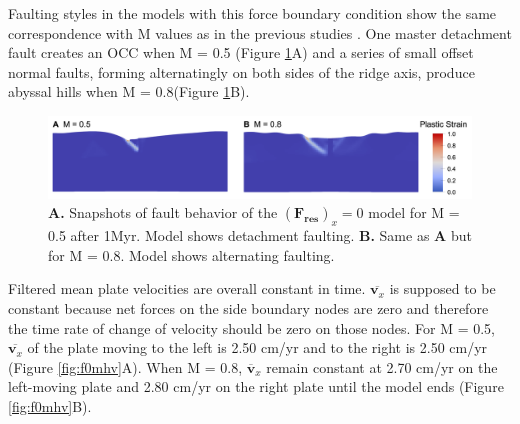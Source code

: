 \documentclass[letterpaper,12pt,notitle]{memphisthesis}                     %
\begin{document}
Faulting styles in the models with this force boundary condition show the same correspondence with M values as in the previous studies \citep{Buck2005,Tucholke2008}. One master detachment fault creates an OCC when M = 0.5 (Figure \ref{fig:f0fault}A) and a series of small offset normal faults, forming alternatingly on both sides of the ridge axis, produce abyssal hills when M = 0.8(Figure \ref{fig:f0fault}B).
%
\begin{figure}[!htb]
	\centering
	\includegraphics[width=0.99\linewidth,trim=8 8 8 8,clip]{./figs/f0fault.png}
	\caption{\textbf{A.} Snapshots of fault behavior of the $(\boldsymbol{F_{res}})_x=0$ model for M = 0.5 after 1Myr. Model shows detachment faulting. \textbf{B.} Same as \textbf{A} but for M = 0.8. Model shows alternating faulting.}
	\label{fig:f0fault}
\end{figure}

Filtered mean plate velocities are overall constant in time. $\overline{\boldsymbol{v}_x}$ is supposed to be constant because net forces on the side boundary nodes are zero and therefore the time rate of change of velocity should be zero on those nodes. For M = 0.5, $\overline{\boldsymbol{v}_x}$ of the plate moving to the left is 2.50 cm/yr and to the right is 2.50 cm/yr (Figure \ref{fig:f0mhv}A). When M = 0.8, $\overline{\boldsymbol{v}}_{x}$ remain constant at 2.70 cm/yr on the left-moving plate and 2.80 cm/yr on the right plate until the model ends (Figure \ref{fig:f0mhv}B).
\end{document}
